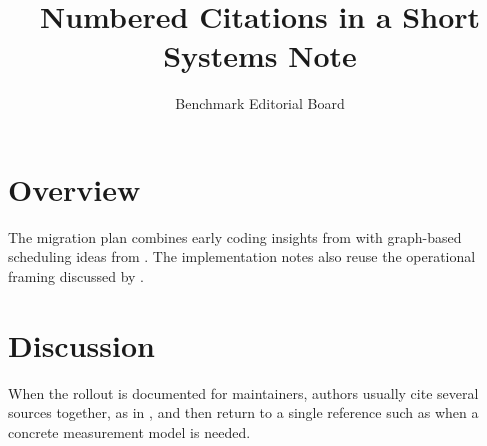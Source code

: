 \documentclass{article}
\begin{document}
\title{Numbered Citations in a Short Systems Note}
\author{Benchmark Editorial Board}
\date{}
\maketitle

\section{Overview}
The migration plan combines early coding insights from \cite{aho86} with
graph-based scheduling ideas from \cite{tarjan72}. The implementation notes also
reuse the operational framing discussed by \cite{dijkstra68}.

\section{Discussion}
When the rollout is documented for maintainers, authors usually cite several
sources together, as in \cite{knuth84,lamport94}, and then return to a single
reference such as \cite{shannon48} when a concrete measurement model is needed.


\end{document}
